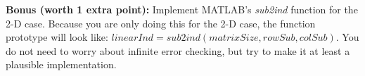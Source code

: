 \documentclass[11pt]{article}
\begin{document}
\noindent
\newline
\textbf{Bonus (worth 1 extra point):}
Implement MATLAB's \textit{sub2ind} function for the 2-D case.
Because you are only doing this for the 2-D case,
the function prototype will look like: $linearInd = sub2ind(matrixSize, rowSub, colSub)$.
You do not need to worry about infinite error checking, 
but try to make it at least a plausible implementation.
\end{document}
